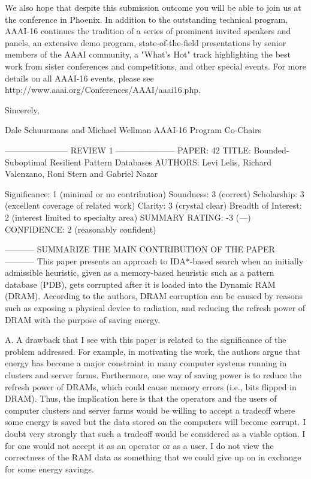 We also hope that despite this submission outcome you will be able to join us at the conference in Phoenix.
In addition to the outstanding technical program, AAAI-16 continues the tradition of a series of prominent
invited speakers and panels, an extensive demo program, state-of-the-field presentations by senior
members of the AAAI community, a "What's Hot" track highlighting the best work from sister conferences
and competitions, and other special events. For more details on all AAAI-16 events, please see
http://www.aaai.org/Conferences/AAAI/aaai16.php.

Sincerely,

Dale Schuurmans and Michael Wellman
AAAI-16 Program Co-Chairs


----------------------- REVIEW 1 ---------------------
PAPER: 42
TITLE: Bounded-Suboptimal Resilient Pattern Databases
AUTHORS: Levi Lelis, Richard Valenzano, Roni Stern and Gabriel Nazar

Significance: 1 (minimal or no contribution)
Soundness: 3 (correct)
Scholarship: 3 (excellent coverage of related work)
Clarity: 3 (crystal clear)
Breadth of Interest: 2 (interest limited to specialty area)
SUMMARY RATING: -3 (---)
CONFIDENCE: 2 (reasonably confident)

----------- SUMMARIZE THE MAIN CONTRIBUTION OF THE PAPER -----------
This paper presents an approach to IDA*-based search when an initially admissible heuristic, given as a memory-based heuristic such as a pattern database (PDB), gets corrupted after it is loaded into the Dynamic RAM (DRAM). According to the authors, DRAM corruption can be caused by reasons such as exposing a physical device to radiation, and reducing the refresh power of DRAM with the purpose of saving energy.

A. A drawback that I see with this paper is related to the significance of the problem addressed. For example, in motivating the work, the authors argue that energy has become a major constraint in many computer systems running in clusters and server farms. Furthermore, one way of saving power is to reduce the refresh power of DRAMs, which could cause memory errors (i.e., bits flipped in DRAM). Thus, the implication here is that the operators and the users of computer clusters and server farms would be willing to accept a tradeoff where some energy is saved but the data stored on the computers will become corrupt. I doubt very strongly that such a tradeoff would be considered as a viable option. I for one would not accept it as an operator or as a user. I do not view the correctness of the RAM data as something that we could give up on in exchange for some energy savings.

